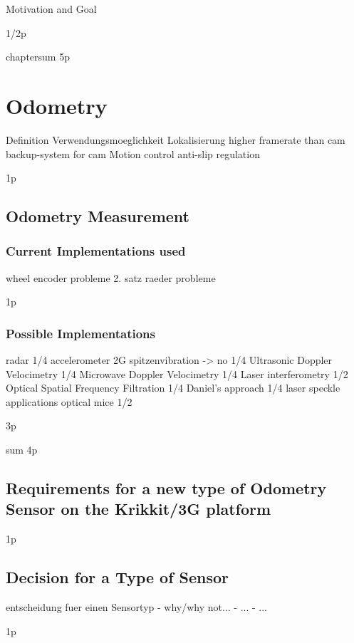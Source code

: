 \documentclass[12pt,a4paper]{article}
\begin{document}
Motivation and Goal

1/2p

chaptersum 5p

\section{Odometry}
  Definition
  Verwendungsmoeglichkeit
    Lokalisierung
      higher framerate than cam
      backup-system for cam
    Motion control
      anti-slip regulation

1p

\subsection{Odometry Measurement}

\subsubsection{Current Implementations used}

      wheel encoder
        probleme
      2. satz raeder
        probleme

1p

\subsubsection{Possible Implementations}

      radar
1/4
      accelerometer
        2G spitzenvibration -> no
1/4
      Ultrasonic Doppler Velocimetry
1/4
      Microwave Doppler Velocimetry
1/4
      Laser interferometry
1/2
      Optical Spatial Frequency Filtration
1/4
        Daniel's approach
1/4
        laser speckle applications
        optical mice
1/2

3p

sum 4p

\subsection{Requirements for a new type of Odometry Sensor on the Krikkit/3G platform}

1p


\subsection{Decision for a Type of Sensor}
  entscheidung fuer einen Sensortyp
    - why/why not...
    - ...
    - ...

1p
\end{document}
